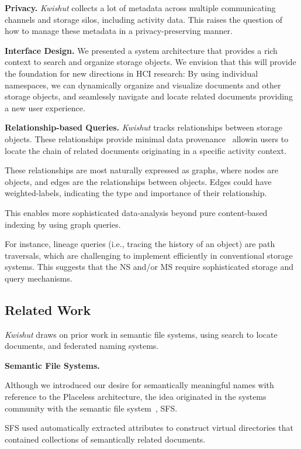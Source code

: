 \noindent\textbf{Privacy.}
\emph{Kwishut} collects a lot of metadata across multiple communicating channels and
storage silos, including activity data. This raises the question of how to
manage these metadata in a privacy-preserving manner.

\noindent\textbf{Interface Design.}
We presented a system architecture that provides a rich context to search and
organize storage objects. We envision that this will provide the foundation for
new directions in HCI research: By using individual namespaces, we can
dynamically organize and visualize documents and other storage objects, and
seamlessly navigate and locate related documents providing a new user
experience.

\noindent\textbf{Relationship-based Queries.}
\emph{Kwishut} tracks relationships between storage objects. These relationships
provide minimal data provenance~\cite{provprimer} allowin users to locate the
chain of related documents originating in a specific activity context.

These relationships are most naturally expressed as graphs, where nodes are
objects, and edges are the relationships between objects. Edges could have
weighted-labels, indicating the type and importance of their relationship.

This enables more sophisticated data-analysis beyond pure content-based indexing
by using graph queries.

For instance, lineage queries (i.e., tracing the history of an object) are path
traversals, which are challenging to implement efficiently in conventional
storage systems. This suggests that the NS and/or MS require sophisticated
storage and query mechanisms.

\subsection{Related Work}
\label{hotstorage:background}

\emph{Kwishut} draws on prior work in semantic file systems, using search to locate
documents, and federated naming systems.

\noindent\textbf{Semantic File Systems.}

Although we introduced our desire for semantically meaningful names with
reference to the Placeless architecture, the idea originated in the systems
community with the semantic file system~\cite{giffordSFS}, SFS.

SFS used automatically extracted attributes to construct virtual directories
that contained collections of semantically related documents.

